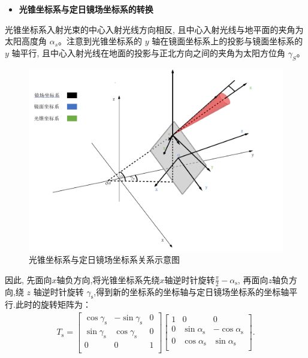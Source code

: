 \documentclass[../main.tex]{subfiles}
\begin{document}
\begin{itemize}
\item \textbf{光锥坐标系与定日镜场坐标系的转换}
\end{itemize}
\par 光锥坐标系入射光束的中心入射光线方向相反, 且中心入射光线与地平面的夹角为太阳高度角 $\alpha _s$。注意到光锥坐标系的 $y$ 轴在镜面坐标系上的投影与镜面坐标系的 $y$ 轴平行, 且中心入射光线在地面的投影与正北方向之间的夹角为太阳方位角 $\gamma_S$。
\begin{figure}[H]
\centering
\includegraphics[width=.9\textwidth]{5}
\caption{光锥坐标系与定日镜场坐标系关系示意图}
\label{1.16}
\end{figure}
\par 因此, 先面向$x$轴负方向,将光锥坐标系先绕$x$轴逆时针旋转$\frac{\pi}{2}-\alpha_\text{s}$, 再面向$z$轴负方向,绕 $z$ 轴逆时针旋转 $\gamma_\text{s}$,得到新的坐标系的坐标轴与定日镜场坐标系的坐标轴平行.此时的旋转矩阵为：
\begin{align}    \label{1.17}
T_\text{s}=\left[ \begin{matrix}
\cos \gamma _\text{s}&		-\sin \gamma _\text{s}&		0\\
\sin \gamma _\text{s}&		\cos \gamma _\text{s}&		0\\
0&		0&		1\\
\end{matrix} \right] \left[ \begin{matrix}
1&		0&		0\\
0&		\sin \alpha _\text{s}&		-\cos \alpha _\text{s}\\
0&		\cos \alpha _\text{s}&		\sin \alpha _\text{s}\\
\end{matrix} \right] .
\end{align}
\end{document}
